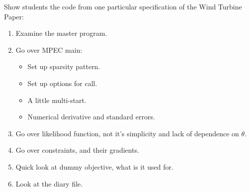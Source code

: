 \documentclass[twoside]{article}
\begin{document}
Show students the code from one particular specification of the Wind Turbine Paper: 
\begin{enumerate}
\item Examine the master program. 
\item Go over MPEC main: 
\begin{itemize}
 \item Set up sparsity pattern. 
 \item Set up options for call. 
 \item A little multi-start. 
 \item Numerical derivative and standard errors.
 \end{itemize}
\item Go over likelihood function, not it's simplicity and lack of dependence on $\theta$. 
\item Go over constraints, and their gradients. 
\item Quick look at dummy objective, what is it used for. 
\item Look at the diary file. 
\end{enumerate}
\end{document}

